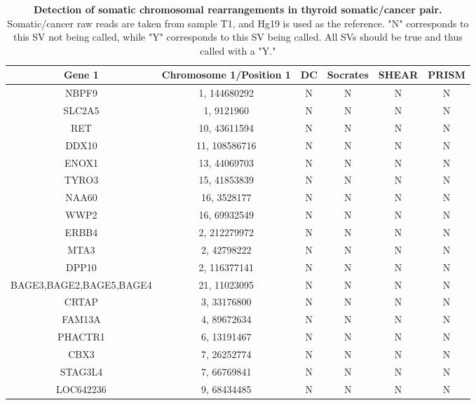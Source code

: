 \documentclass{easychithesis}
\begin{document}
\begin{table}[h]
\begin{center}
\hspace*{-2.9cm}
\begin{tabular}{|c|c|c|c|c|c|}\hline
        \bf{Gene 1} & \bf{Chromosome 1/Position 1} & \bf{DC} & \bf{Socrates} & \bf{SHEAR} & \bf{PRISM}\\
        \hline 
        NBPF9 & 1, 144680292 & N & N & N & N\\
        \hline
        SLC2A5 & 1, 9121960 & N & N & N & N\\
        \hline
        RET & 10, 43611594 & N & N & N & N\\
        \hline
        DDX10 & 11, 108586716 & N & N & N & N\\
        \hline
        ENOX1 & 13, 44069703 & N & N & N & N\\
        \hline
        TYRO3 & 15, 41853839 & N & N & N & N\\
        \hline
        NAA60 & 16, 3528177  & N & N & N & N\\
        \hline
        WWP2 & 16, 69932549  & N & N & N & N\\
        \hline
        ERBB4 & 2, 212279972  & N & N & N & N\\
        \hline
        MTA3 & 2, 42798222  & N & N & N & N\\
        \hline
        DPP10 & 2, 116377141  & N & N & N & N\\
        \hline
        BAGE3,BAGE2,BAGE5,BAGE4 & 21, 11023095 & N & N & N & N\\
        \hline
        CRTAP & 3, 33176800 & N & N & N & N\\
        \hline
        FAM13A & 4, 89672634 & N & N & N & N\\
        \hline
        PHACTR1 & 6, 13191467 & N & N & N & N\\
        \hline
        CBX3 & 7, 26252774 & N & N & N & N\\
        \hline
        STAG3L4 & 7, 66769841 & N & N & N & N\\
        \hline
        LOC642236 & 9, 68434485  & N & N & N & N\\
        \hline
\end{tabular}
\caption{{\bf Detection of somatic chromosomal rearrangements in thyroid somatic/cancer pair.} Somatic/cancer raw reads are taken from sample T1\cite{ricarte2013identification}, and Hg19 is used as the reference. "N" corresponds to this SV not being called, while "Y" corresponds to this SV being called. All SVs should be true and thus called with a "Y."}
\hspace*{-2.9cm}
\end{center}
\end{table}
\end{document}
